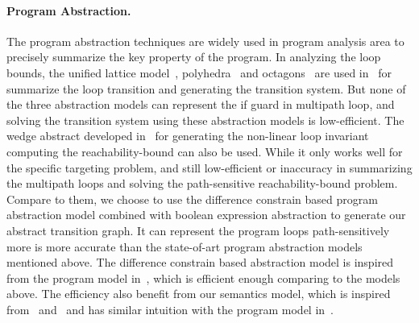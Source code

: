 
\paragraph*{Program Abstraction.}
The program abstraction techniques are widely used in program analysis area to precisely summarize the key property of the program.
In analyzing the loop bounds, the unified lattice model~\cite{CousotH78}, polyhedra~\cite{CousotC77} and octagons~\cite{Mine06} are used in~\cite{GulwaniZ10} for summarize the loop transition and generating the transition system.
But none of the three abstraction models can represent the if guard in multipath loop, and solving the transition system using these abstraction models is low-efficient.
The wedge abstract developed in~\cite{KincaidCBR18} for generating the non-linear loop invariant
computing the reachability-bound can also be used. While it only works well for the specific targeting problem, and still low-efficient or inaccuracy in summarizing the multipath loops and solving the path-sensitive reachability-bound problem. 
Compare to them, we choose to use the difference constrain based program abstraction model combined with boolean expression abstraction to generate our abstract transition graph. It can represent the program loops path-sensitively more is more accurate than the state-of-art program abstraction models mentioned above.
The difference constrain based abstraction model is inspired from the program model in~\cite{SinnZV17}, which is efficient enough comparing to the models above. The efficiency also benefit from our
semantics model, which is inspired from~\cite{Cousot19a} and~\cite{Cousot19} and has similar intuition with the program model in~\cite{SinnZV17}.

